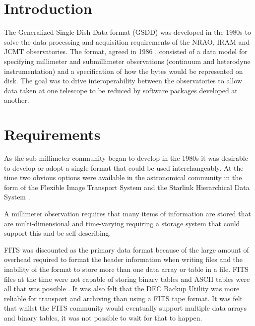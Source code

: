 \documentclass[final,authoryear,5p,times,twocolumn]{elsarticle}
\begin{document}

\newcommand{\mnras}{MNRAS}
\newcommand{\aap}{A\&A}
\newcommand{\aaps}{A\&AS}
\newcommand{\pasp}{PASP}
\newcommand{\apj}{ApJ}
\newcommand{\apjs}{ApJS}
\newcommand{\qjras}{QJRAS}
\newcommand{\an}{Astron.\ Nach.}
\newcommand{\ijimw}{Int.\ J.\ Infrared \& Millimeter Waves}
\newcommand{\procspie}{Proc.\ SPIE}
\newcommand{\aspconf}{ASP Conf. Ser.}



\newcommand{\ascl}[1]{\href{http://www.ascl.net/#1}{ascl:#1}}


\section{Introduction}

The Generalized Single Dish Data format (GSDD) was developed in the
1980s to solve the data processing and acquisition requirements of the
NRAO, IRAM and JCMT observatories. The format, agreed in 1986
\citep{mtdn85}, consisted of a data model for specifying millimeter
and submillimeter observations (continuum and heterodyne
instrumentation) and a specification of how the bytes would be
represented on disk. The goal was to drive interoperability between
the observatories to allow data taken at one telescope to be reduced
by software packages developed at another.

\section{Requirements}

As the sub-millimeter community began to develop in the 1980s it was
desirable to develop or adopt a single format that could be used
interchangeably. At the time two obvious options were available in the
astronomical community in the form of the Flexible Image Transport System
\citep[FITS;][]{1981A&AS...44..363W} and the Starlink Hierarchical
Data System \citep[HDS;][]{1982QJRAS..23..485D,2015HDS}.

A millimeter observation requires that many items of information are
stored that are multi-dimensional and time-varying requiring a storage
system that could support this and be self-describing.

FITS was discounted as the primary data format because of the large
amount of overhead required to format the header information when
writing files and the inability of the format to store more than one
data array or table in a file. FITS files at the time were not capable
of storing binary tables and ASCII tables were all that was possible
\citep{1988A&AS...73..365H}. It was also felt that the DEC Backup
Utility was more reliable for transport and archiving than using a
FITS tape format. It was felt that whilst the FITS community would
eventually support multiple data arrays and binary tables, it was not
possible to wait for that to happen.
\end{document}
